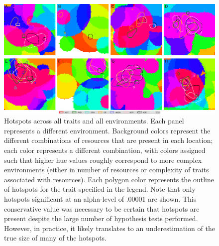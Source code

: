 \documentclass[letterpaper]{article}
\begin{document}
\begin{figure}[t]
\begin{center}
\includegraphics[width=7in]{figs/50065_all_hotspots.png}
\caption{Hotspots across all traits and all environments. Each panel represents a different environment. Background colors represent the different combinations of resources that are present in each location; each color represents a different combination, with colors assigned such that higher hue values %
roughly correspond to more complex environments (either in number of resources or complexity of traits associated with resources). Each polygon color represents the outline of hotspots for the trait specified in the legend. Note that only hotspots significant at an alpha-level of .00001 are shown. This conservative value was necessary to be certain that hotspots are present despite the large number of hypothesis tests performed. However, in practice, it likely translates to an underestimation of the true size of many of the hotspots.}
\label{hotspots}
\end{center}
\end{figure}
\end{document}
